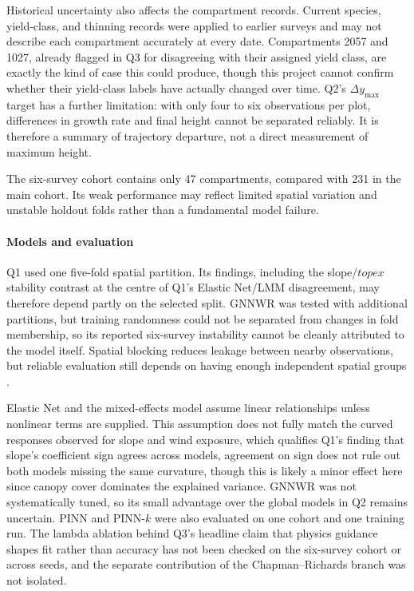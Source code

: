 \documentclass[logo,msc,ai]{infthesis}           %
\begin{document}
Historical uncertainty also affects the compartment records. Current species, yield-class, and thinning records were applied to earlier surveys and may not describe each compartment accurately at every date. Compartments 2057 and 1027, already flagged in Q3 for disagreeing with their assigned yield class, are exactly the kind of case this could produce, though this project cannot confirm whether their yield-class labels have actually changed over time. Q2's $\Delta y_{\max}$ target has a further limitation: with only four to six observations per plot, differences in growth rate and final height cannot be separated reliably. It is therefore a summary of trajectory departure, not a direct measurement of maximum height.

The six-survey cohort contains only 47 compartments, compared with 231 in the main cohort. Its weak performance may reflect limited spatial variation and unstable holdout folds rather than a fundamental model failure.

\paragraph*{Models and evaluation}

Q1 used one five-fold spatial partition. Its findings, including the slope/$\mathit{topex}$ stability contrast at the centre of Q1's Elastic Net/LMM disagreement, may therefore depend partly on the selected split. GNNWR was tested with additional partitions, but training randomness could not be separated from changes in fold membership, so its reported six-survey instability cannot be cleanly attributed to the model itself. Spatial blocking reduces leakage between nearby observations, but reliable evaluation still depends on having enough independent spatial groups \cite{roberts2017Cross_C5_EVAL,ploton2020Spatial_C5_EVAL}.

Elastic Net and the mixed-effects model assume linear relationships unless nonlinear terms are supplied. This assumption does not fully match the curved responses observed for slope and wind exposure, which qualifies Q1's finding that slope's coefficient sign agrees across models, agreement on sign does not rule out both models missing the same curvature, though this is likely a minor effect here since canopy cover dominates the explained variance. GNNWR was not systematically tuned, so its small advantage over the global models in Q2 remains uncertain. PINN and PINN-$k$ were also evaluated on one cohort and one training run. The lambda ablation behind Q3's headline claim that physics guidance shapes fit rather than accuracy has not been checked on the six-survey cohort or across seeds, and the separate contribution of the Chapman--Richards branch was not isolated.
\end{document}
